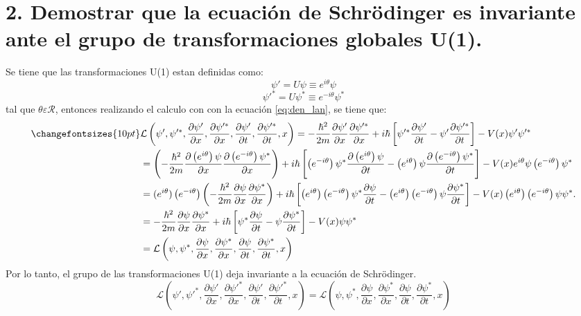 \section*{2. Demostrar que la ecuación de Schr\"odinger es invariante ante el grupo de transformaciones globales U(1).}
Se tiene que las transformaciones U(1) estan definidas como:
\begin{equation}
   {\psi}'= U\psi \equiv e^{i\theta}\psi
   \label{eq:operador_u}
\end{equation}
\begin{equation}
    {\psi}'^*= U\psi^* \equiv e^{-i\theta}\psi^*
\end{equation}
tal que $\theta \varepsilon \mathcal{R}$, entonces realizando el calculo con con la ecuación \ref{eq:den_lan}, se tiene que:
\begin{align*}
    \changefontsizes{10pt}
    &\mathcal{L}\left({\psi}',{\psi}'^*,\frac{\partial {\psi}'}{\partial x},\frac{\partial {\psi}'^*}{\partial x},\frac{\partial {\psi}'}{\partial t},\frac{\partial {\psi}'^*}{\partial t},x\right) = -\frac{\hbar^2}{2m} \frac{\partial {\psi}'}{\partial x} \frac{\partial {\psi}'^*}{\partial x}+i\hbar \left[ {\psi}'^* \frac{\partial {\psi}'}{\partial t} - {\psi}' \frac{\partial {\psi}'^*}{\partial t} \right] -V(x){\psi}' {\psi}'^*\\
    &=\left(- \frac{\hbar^2}{2m} \frac{\partial \left(e^{i\theta}\right)\psi}{\partial x}\frac{\partial \left(e^{-i\theta}\right)\psi^*}{\partial x}\right) +i\hbar \left[ \left(e^{-i\theta}\right)\psi^* \frac{\partial \left(e^{i\theta}\right)\psi}{\partial t} - \left(e^{i\theta}\right)\psi \frac{\partial \left(e^{-i\theta}\right)\psi^*}{\partial t} \right] - V(x) e^{i\theta}\psi \left(e^{-i\theta}\right)\psi^*\\
    &=(e^{i\theta})\left(e^{-i\theta}\right)\left(-\frac{\hbar^2}{2m} \frac{\partial \psi}{\partial x} \frac{\partial \psi^*}{\partial x}\right)+i\hbar \left[\left(e^{i\theta}\right)\left(e^{-i\theta}\right) \psi^* \frac{\partial \psi}{\partial t} -\left(e^{i\theta}\right)\left(e^{-i\theta}\right) \psi \frac{\partial \psi^*}{\partial t} \right] -V(x)\left(e^{i\theta}\right)\left(e^{-i\theta}\right)\psi \psi^*.\\
    &=-\frac{\hbar^2}{2m} \frac{\partial \psi}{\partial x} \frac{\partial \psi^*}{\partial x}+i\hbar \left[ \psi^* \frac{\partial \psi}{\partial t} - \psi \frac{\partial \psi^*}{\partial t} \right] -V(x)\psi \psi^*\\
    &=\mathcal{L}\left(\psi,\psi^*,\frac{\partial \psi}{\partial x},\frac{\partial \psi^*}{\partial x},\frac{\partial \psi}{\partial t},\frac{\partial \psi^*}{\partial t},x\right)
\end{align*}
Por lo tanto, el grupo de las transformaciones U(1) deja invariante a la ecuación de Schr\"odinger.
\begin{equation}
    \mathcal{L}\left({\psi}',{\psi}'^*,\frac{\partial {\psi}'}{\partial x},\frac{\partial {\psi}'^*}{\partial x},\frac{\partial {\psi}'}{\partial t},\frac{\partial {\psi}'^*}{\partial t},x\right) = \mathcal{L}\left(\psi,\psi^*,\frac{\partial \psi}{\partial x},\frac{\partial \psi^*}{\partial x},\frac{\partial \psi}{\partial t},\frac{\partial \psi^*}{\partial t},x\right)
\end{equation}
